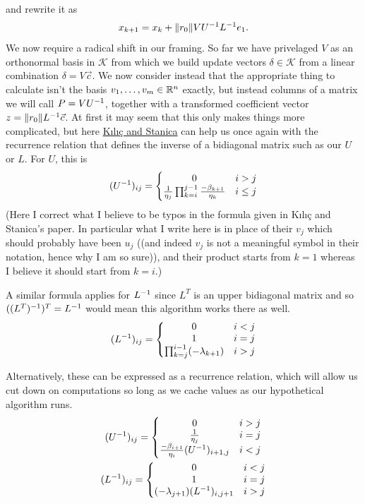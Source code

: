 \documentclass[11pt]{article}
\begin{document}
and rewrite it as \begin{gather*}
x_{k+1} = x_k + \lVert r_0 \rVert V U^{-1} L^{-1} e_1.
\end{gather*}
We now require a radical shift in our framing. So far we have privelaged $V$ as an orthonormal basis in $\mathcal K$ from which we build update vectors $\delta \in \mathcal K$ from a linear combination $\delta = V \vec c$. We now consider instead that the appropriate thing to calculate isn't the basis $v_1, \dots, v_m \in \mathbb{R}^n$ exactly, but instead columns of a matrix we will call $P = V U^{-1}$, together with a transformed coefficient vector $z = \lVert r_0 \rVert L^{-1} \vec c$. At first it may seem that this only makes things more complicated, but here \hyperlink{https://doi.org/10.1016/j.cam.2012.07.018}{Kılıç and Stanica} can help us once again with the recurrence relation that defines the inverse of a bidiagonal matrix such as our $U$ or $L$. For $U$, this is \begin{gather*}
(U^{-1})_{ij} = \left\{ \begin{matrix} 0 & i > j \\ \frac1{\eta_j} \prod_{k=i}^{j-1} \frac{- \beta_{k+1}}{\eta_{k} } & i \le j \end{matrix} \right.
\end{gather*}
(Here I correct what I believe to be typos in the formula given in Kılıç and Stanica's paper. In particular what I write here is in place of their $v_j$ which should probably have been $u_j$ ((and indeed $v_j$ is not a meaningful symbol in their notation, hence why I am so sure)), and their product starts from $k=1$ whereas I believe it should start from $k=i$.)

A similar formula applies for $L^{-1}$ since $L^T$ is an upper bidiagonal matrix and so $((L^T)^{-1})^T = L^{-1}$ would mean this algorithm works there as well.
\begin{gather*}
(L^{-1})_{ij} = \left\{ \begin{matrix} 0 & i < j \\ 1 & i = j \\ \prod_{k=j}^{i-1} (- \lambda_{k+1}) & i > j \end{matrix} \right.
\end{gather*}

Alternatively, these can be expressed as a recurrence relation, which will allow us cut down on computations so long as we cache values as our hypothetical algorithm runs. \begin{gather*}
(U^{-1})_{ij} =  \left\{ \begin{matrix} 0 & i > j \\ \frac1{\eta_{j} } & i = j \\ \frac{- \beta_{i+1} }{\eta_{i} } (U^{-1})_{i+1,j} & i < j \end{matrix} \right. \\
(L^{-1})_{ij} =  \left\{ \begin{matrix} 0 & i < j \\ 1 & i = j \\ (- \lambda_{j+1}) (L^{-1})_{i,j+1} & i > j \end{matrix} \right.
\end{gather*}
\end{document}
